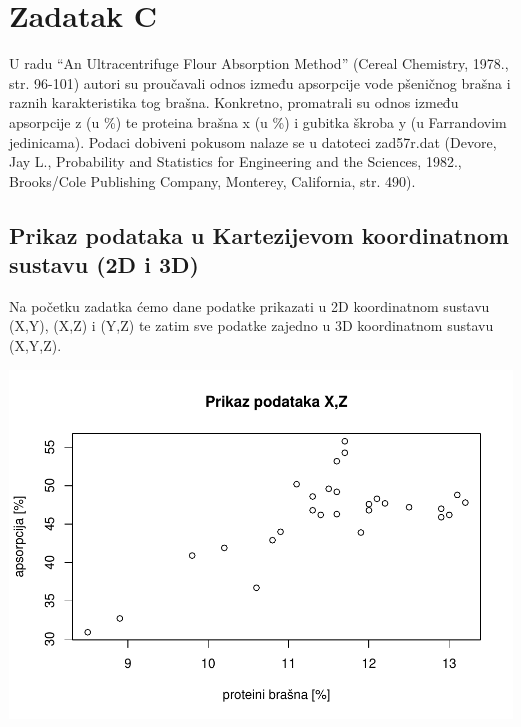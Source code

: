 \documentclass[]{article}
\newenvironment{Shaded}{\begin{snugshade}}{\end{snugshade}}
\newcommand{\KeywordTok}[1]{\textcolor[rgb]{0.13,0.29,0.53}{\textbf{{#1}}}}
\newcommand{\DataTypeTok}[1]{\textcolor[rgb]{0.13,0.29,0.53}{{#1}}}
\newcommand{\StringTok}[1]{\textcolor[rgb]{0.31,0.60,0.02}{{#1}}}
\newcommand{\OtherTok}[1]{\textcolor[rgb]{0.56,0.35,0.01}{{#1}}}
\newcommand{\NormalTok}[1]{{#1}}
\begin{document}
\section{Zadatak C}\label{zadatak-c}

U radu ``An Ultracentrifuge Flour Absorption Method'' (Cereal Chemistry,
1978., str. 96-101) autori su proučavali odnos između apsorpcije vode
pšeničnog brašna i raznih karakteristika tog brašna. Konkretno,
promatrali su odnos između apsorpcije z (u \%) te proteina brašna x (u
\%) i gubitka škroba y (u Farrandovim jedinicama). Podaci dobiveni
pokusom nalaze se u datoteci zad57r.dat (Devore, Jay L., Probability and
Statistics for Engineering and the Sciences, 1982., Brooks/Cole
Publishing Company, Monterey, California, str. 490).

\subsection{Prikaz podataka u Kartezijevom koordinatnom sustavu (2D i
3D)}\label{prikaz-podataka-u-kartezijevom-koordinatnom-sustavu-2d-i-3d}

Na početku zadatka ćemo dane podatke prikazati u 2D koordinatnom sustavu
(X,Y), (X,Z) i (Y,Z) te zatim sve podatke zajedno u 3D koordinatnom
sustavu (X,Y,Z).

\begin{Shaded}
\end{Shaded}

\includegraphics{Izvjestaj_files/figure-latex/unnamed-chunk-25-1.pdf}
\end{document}
